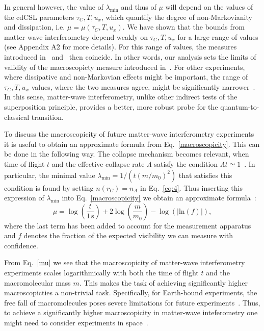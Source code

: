 \documentclass[prl,twocolumn,showpacs,superscriptaddress,groupedaddress]{revtex4}
\begin{document}
In general however, the value of $\lambda_{\text{min}}$ and thus of $\mu$ will depend on the values of the cdCSL parameters $\tau_C,T,u_x$, which quantify the degree of non-Markovianity and dissipation, i.e. $\mu=\mu(\tau_C,T,u_x)$.  We have shown that the bounds from matter-wave interferometry depend weakly on $\tau_C,T,u_x$ for a large range of values (see Appendix A2 for more details). For this range of values, the measures introduced in~\cite{gasbarri2017general} and~\cite{nimmrichter2013macroscopicity}  then coincide. In other words, our analysis  sets the limits of validity of the macroscopicty measure introduced in~\cite{nimmrichter2013macroscopicity}. For other experiments, where dissipative and non-Markovian effects might be important, the range of $\tau_C,T,u_x$ values, where the two measures agree, might be significantly narrower~\cite{gasbarri2017general}. In this sense, matter-wave interferometry, unlike other indirect tests of the superposition principle, provides a  better, more robust probe for the quantum-to-classical transition. 

To discuss the macroscopicity of future matter-wave interferometry experiments it is useful to obtain an approximate formula from Eq.~\eqref{macroscopicity}. This can be done in the following way. The collapse mechanism becomes relevant, when time of flight $t$ and the effective collapse rate $\Lambda$ satisfy the condition $\Lambda t\simeq 1$~\cite{1751-8121-45-6-065304}. In particular, the minimal value $\lambda_{\text{min}}=1/(t (m/m_0)^2)$ that satisfies this condition is found by setting $n(r_C)=n_A$ in Eq.~\eqref{eq:4}. Thus inserting this expression of $\lambda_{\text{min}}$ into Eq.~\eqref{macroscopicity} we obtain an approximate formula~\cite{nimmrichter2013macroscopicity}:
\begin{equation}
\mu=\log \left(\frac{t}{1\,\text{s}}\right)
+2 \log \left(\frac{m}{m_0}\right)
-\log \left(|\text{ln} (f)|\right),
\label{mu}
\end{equation}
where the last term has been added to account for the measurement apparatus and $f$ denotes the fraction of the expected visibility we can measure with confidence. 

From Eq.~\eqref{mu} we see that the  macroscopicity of matter-wave interferometry experiments scales logarithmically with both the time of flight $t$ and the macromolecular mass $m$. This makes the task of achieving significantly higher macroscopicties a non-trivial task. Specifically, for Earth-bound experiments, the free fall of macromolecules poses severe limitations for future experiments~\cite{nimmrichter2011testing}. Thus, to achieve a significantly higher macroscopicity in matter-wave inteferometry one might need to consider experiments in space~\cite{kaltenbaek2016macroscopic}.
\end{document}
